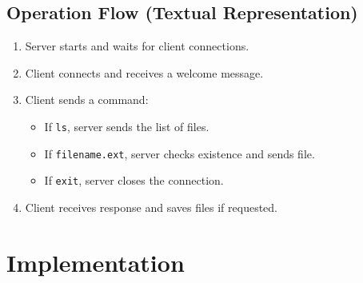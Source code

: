 \documentclass{article}
\begin{document}
\subsection{Operation Flow (Textual Representation)}
\begin{enumerate}
    \item Server starts and waits for client connections.
    \item Client connects and receives a welcome message.
    \item Client sends a command:
    \begin{itemize}
        \item If \texttt{ls}, server sends the list of files.
        \item If \texttt{filename.ext}, server checks existence and sends file.
        \item If \texttt{exit}, server closes the connection.
    \end{itemize}
    \item Client receives response and saves files if requested.
\end{enumerate}

\section{Implementation}
\end{document}
